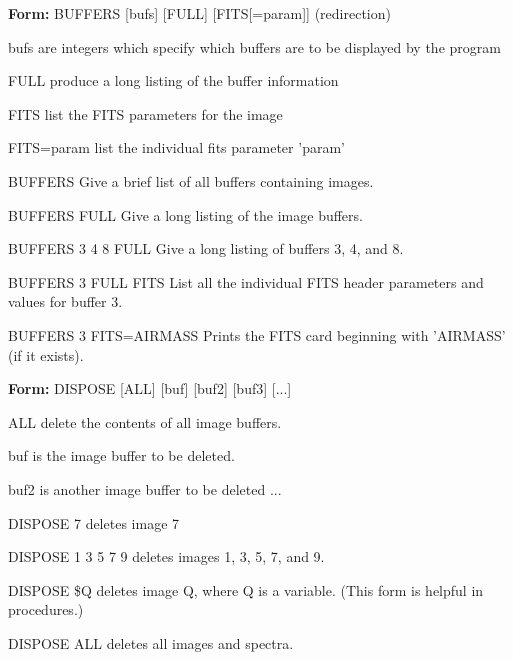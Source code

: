 {\newpage\clearpage
{}%
\begin{command}
  \item[\textbf{Form: } BUFFERS {[bufs]} {[FULL]} {[FITS{[=param]}]}
       (redirection)\hfill]{}
  \item[bufs]{ are integers which specify which buffers are to be displayed
       by the program}
  \item[FULL]{produce a long listing of the buffer information}
  \item[FITS]{list the FITS parameters for the image}
  \item[FITS=param]{list the individual fits parameter 'param'}
\end{command}%
\lthtmlfigureZ
\lthtmlcheckvsize\clearpage}

{\newpage\clearpage
{}%
\begin{example}
  \item[BUFFERS\hfill]{Give a brief list of all buffers containing images.}
  \item[BUFFERS FULL\hfill]{Give a long listing of the image buffers.}
  \item[BUFFERS 3 4 8 FULL\hfill]{Give a long listing of buffers 3, 4, and 8.}
  \item[BUFFERS 3 FULL FITS\hfill]{List all the individual FITS header 
       parameters and values for buffer 3.}
  \item[BUFFERS 3 FITS=AIRMASS\hfill]{Prints the FITS card beginning with
       'AIRMASS' (if it exists).}
\end{example}%
\lthtmlfigureZ
\lthtmlcheckvsize\clearpage}

{\newpage\clearpage
{}%
\begin{command}
  \item[\textbf{Form: } DISPOSE {[ALL]} {[buf]} {[buf2]} {[buf3]}
       {[...]} \hfill]{}
  \item[ALL]{delete the contents of all image buffers.}
  \item[buf]{is the image buffer to be deleted.}
  \item[buf2]{is another image buffer to be deleted ...}
\end{command}%
\lthtmlfigureZ
\lthtmlcheckvsize\clearpage}

{\newpage\clearpage
{}%
\begin{example}
  \item[DISPOSE 7\hfill]{deletes image 7}
  \item[DISPOSE 1 3 5 7 9\hfill]{deletes images 1, 3, 5, 7, and 9.}
  \item[DISPOSE \$Q\hfill]{deletes image Q, where Q is a variable.
        (This form is helpful in procedures.)}
  \item[DISPOSE ALL\hfill]{deletes all images and spectra.}
\end{example}%
\lthtmlfigureZ
\lthtmlcheckvsize\clearpage}

